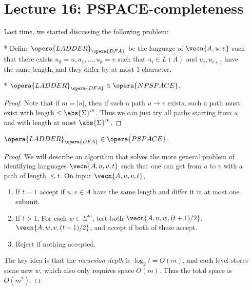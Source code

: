 \section*{Lecture 16: PSPACE-completeness}
\setcounter{section}{16}

Last time, we started discussing the following problem:

\begin{defn}*
	Define $\opera{LADDER}_{\opera{DFA}}$ be the language of $\vecn{A,u,v}$ such that there exists $u_0 = u, u_1, \ldots, u_k = v$ such that $u_i \in L(A)$ and $u_i, u_{i+1}$ have the same length, and they differ by at most $1$ character.
\end{defn}

\begin{fact}*
	$\opera{LADDER}_{\opera{DFA}} \in \opera{NPSPACE}$.
\end{fact}

\begin{proof}
	Note that if $m = |u|$, then if such a path $u\to v$ exists, such a path must exist with length $\leq \abs{\Sigma}^m$.
	Thus we can just try all paths starting from $u$ and with length at most $\abs{\Sigma}^m$.
\end{proof}

\begin{thm}
	$\opera{LADDER}_{\opera{DFA}} \in \opera{PSPACE}$.
\end{thm}

\begin{proof}
	We will describe an algorithm that solves the more general problem of identifying languages $\vecn{A,u,v,t}$ such that one can get from $u$ to $v$ with a path of length $\leq t$. On input $\vecn{A,u,v,t}$, 
	\begin{enumerate}
		\item If $t = 1$ accept if $u,v\in A$ have the same length and differ it in at most one subunit.
		\item If $t > 1$, For each $w\in \Sigma^m$, test both $\vecn{A,u,w,(t+1)/2}$, $\vecn{A,w,v,(t+1)/2}$, and accept if both of these accept.
		\item Reject if nothing accepted.
	\end{enumerate}
	The key idea is that the \emph{recursion depth} is $\log_2 t = O(m)$, and each level stores some new $w$, which also only requires space $O(m)$. Thus the total space is $O(m^2)$.
\end{proof}


